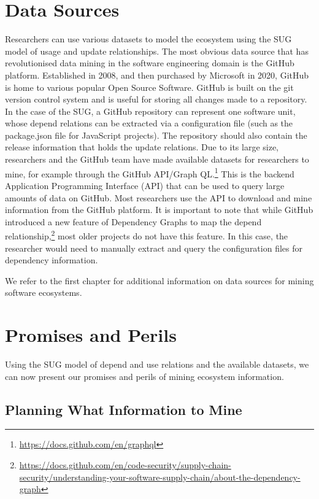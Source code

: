 \section{Data Sources}
Researchers can use various datasets to model the ecosystem using the SUG model of usage and update relationships.
The most obvious data source that has revolutionised data mining in the software engineering domain is the GitHub platform. 
Established in 2008, and then purchased by Microsoft in 2020, GitHub is home to various popular Open Source Software. 
GitHub is built on the git version control system and is useful for storing all changes made to a repository. 
In the case of the SUG, a GitHub repository can represent one software unit, whose depend relations can be extracted via a configuration file (such as the package.json file for JavaScript projects).
The repository should also contain the release information that holds the update relations.
Due to its large size, researchers and the GitHub team have made available datasets for researchers to mine, for example through the GitHub API/Graph QL.\footnote{\url{https://docs.github.com/en/graphql}} This is the backend Application Programming Interface (API) that can be used to query large amounts of data on GitHub. Most researchers use the API to download and mine information from the GitHub platform. 
It is important to note that while GitHub introduced a new feature of Dependency Graphs to map the depend relationship,\footnote{\url{https://docs.github.com/en/code-security/supply-chain-security/understanding-your-software-supply-chain/about-the-dependency-graph}} most older projects do not have this feature.
In this case, the researcher would need to manually extract and query the configuration files for dependency information. 

We refer to the first chapter for additional information on data sources for mining software ecosystems. 

\section{Promises and Perils}
\label{PPM:sec:promisesperils}

Using the SUG model of depend and use relations and the available datasets, we can now present our promises and perils of mining ecosystem information.

\subsection{Planning What Information to Mine}

